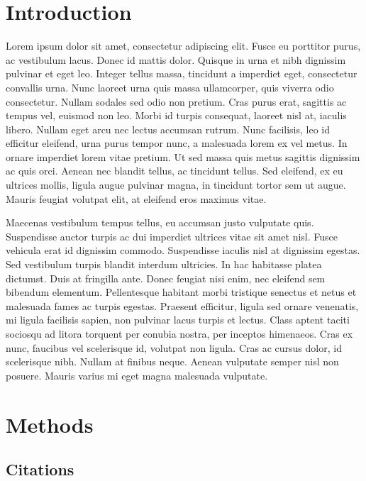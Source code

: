 \hypertarget{introduction}{%
\section{Introduction}\label{introduction}}

Lorem ipsum dolor sit amet, consectetur adipiscing elit. Fusce eu
porttitor purus, ac vestibulum lacus. Donec id mattis dolor. Quisque in
urna et nibh dignissim pulvinar et eget leo. Integer tellus massa,
tincidunt a imperdiet eget, consectetur convallis urna. Nunc laoreet
urna quis massa ullamcorper, quis viverra odio consectetur. Nullam
sodales sed odio non pretium. Cras purus erat, sagittis ac tempus vel,
euismod non leo. Morbi id turpis consequat, laoreet nisl at, iaculis
libero. Nullam eget arcu nec lectus accumsan rutrum. Nunc facilisis, leo
id efficitur eleifend, urna purus tempor nunc, a malesuada lorem ex vel
metus. In ornare imperdiet lorem vitae pretium. Ut sed massa quis metus
sagittis dignissim ac quis orci. Aenean nec blandit tellus, ac tincidunt
tellus. Sed eleifend, ex eu ultrices mollis, ligula augue pulvinar
magna, in tincidunt tortor sem ut augue. Mauris feugiat volutpat elit,
at eleifend eros maximus vitae.

Maecenas vestibulum tempus tellus, eu accumsan justo vulputate quis.
Suspendisse auctor turpis ac dui imperdiet ultrices vitae sit amet nisl.
Fusce vehicula erat id dignissim commodo. Suspendisse iaculis nisl at
dignissim egestas. Sed vestibulum turpis blandit interdum ultricies. In
hac habitasse platea dictumst. Duis at fringilla ante. Donec feugiat
nisi enim, nec eleifend sem bibendum elementum. Pellentesque habitant
morbi tristique senectus et netus et malesuada fames ac turpis egestas.
Praesent efficitur, ligula sed ornare venenatis, mi ligula facilisis
sapien, non pulvinar lacus turpis et lectus. Class aptent taciti
sociosqu ad litora torquent per conubia nostra, per inceptos himenaeos.
Cras ex nunc, faucibus vel scelerisque id, volutpat non ligula. Cras ac
cursus dolor, id scelerisque nibh. Nullam at finibus neque. Aenean
vulputate semper nisl non posuere. Mauris varius mi eget magna malesuada
vulputate.

\hypertarget{methods}{%
\section{Methods}\label{methods}}

\hypertarget{citations}{%
\subsection{Citations}\label{citations}}

